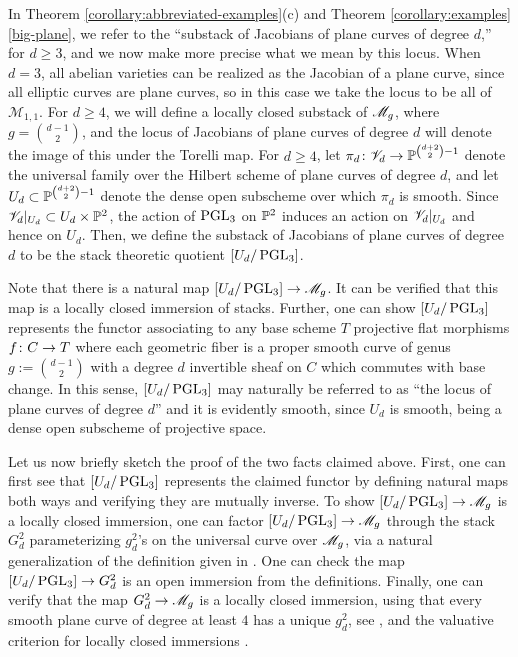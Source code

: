 \begin{remark}
	\label{remark:locus-of-plane-curves}
	In Theorem \ref{corollary:abbreviated-examples}(c) and Theorem \ref{corollary:examples}\autoref{big-plane},
	we refer to the ``substack of Jacobians of plane curves of degree $d$,'' for $d \geq 3$,
	and we now make more precise what we mean
	by this locus.
	When $d=3$, all abelian varieties can be realized as the Jacobian of a plane curve,
	since all elliptic curves are plane curves, so in this case we take the locus to be all of $\mathscr M_{1,1}$.
	For $d \geq 4$, we will define a locally closed substack of ${\mathscr M_g}$, where $g = \binom{d-1}{2}$,
	and the locus of Jacobians of plane curves of degree $d$ will denote the image of this under the Torelli map.
	For $d \geq 4$, let $\pi_d\colon \mathscr V_d \rightarrow {\mathbb P}^{\binom{d+2}{2}-1}$ denote the universal family over 
	the Hilbert scheme of plane curves of degree $d$,
	and let $U_d \subset {\mathbb P}^{\binom{d+2}{2}-1}$ denote the dense open subscheme 
	over which $\pi_d$ is smooth.
	Since $\mathscr V_d|_{U_d} \subset U_d \times {\mathbb P}^2$,
	the action of $\operatorname{PGL}_3$ on ${\mathbb P}^2$ induces an action on $\mathscr V_d|_{U_d}$ and hence on $U_d$.
	Then, we define the substack of Jacobians of plane curves of degree $d$
	to be the stack theoretic quotient $[U_d/\operatorname{PGL}_3]$.
	
	Note that there is a natural map $[U_d/\operatorname{PGL}_3] \rightarrow {\mathscr M_g}$.
	It can be verified that this map is a locally closed immersion of stacks. Further, one
	can show $[U_d/\operatorname{PGL}_3]$ represents the functor associating to any base scheme $T$
	projective flat morphisms $f \colon C \rightarrow T$ where each geometric fiber is a proper smooth curve of genus $g := \binom{d-1}{2}$
	with a degree $d$ invertible sheaf on $C$ which commutes with base change.	
	In this sense, $[U_d/\operatorname{PGL}_3]$ may naturally be referred to as ``the locus of plane curves of degree $d$''
	and it is evidently smooth, since $U_d$ is smooth, being a dense open subscheme of projective space.

	Let us now briefly sketch the proof of the two facts claimed above.
	First, one can first see that $[U_d/\operatorname{PGL}_3]$ represents the claimed
	functor by defining natural maps both ways and verifying they are mutually inverse.
	To show $[U_d/\operatorname{PGL}_3] \rightarrow {\mathscr M_g}$ is a locally closed immersion,
	one can factor $[U_d/\operatorname{PGL}_3] \rightarrow {\mathscr M_g}$ through the stack $G^2_d$ parameterizing $g^2_d$'s on 
	the universal curve over ${\mathscr M_g}$,
	via a natural generalization of the definition given in \cite[Chapter XXI, Definition 3.12]{ACMG:geometryOfCurves}.
	One can check the map $[U_d/\operatorname{PGL}_3] \rightarrow G^2_d$ is an open immersion from the definitions.
	Finally, one can verify that the map $G^2_d \rightarrow {\mathscr M_g}$ is a locally closed immersion, using that
	every smooth plane curve of degree at least $4$ has a unique $g^2_d$, see \cite[Appendix A, Exercises 17 and 18]{ACGH:I},
	and the valuative criterion for locally closed immersions \cite[Chapter 1, Corollary 2.13]{mochizuki2014foundations}.
\end{remark}

